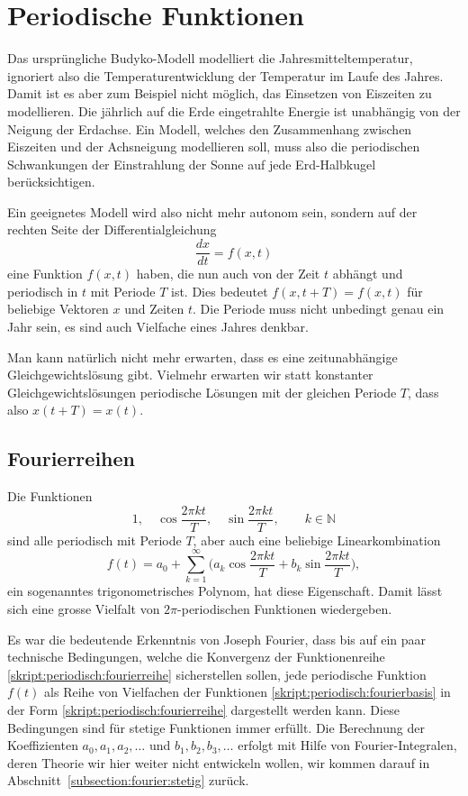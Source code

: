 %
%
%
\section{Periodische Funktionen}
Das ursprüngliche Budyko-Modell modelliert die Jahresmitteltemperatur,
ignoriert also die Temperaturentwicklung der Temperatur im Laufe des
Jahres.
Damit ist es aber zum Beispiel nicht möglich, das Einsetzen von
Eiszeiten zu modellieren.
Die jährlich
auf die Erde eingetrahlte Energie ist unabhängig von der Neigung der
Erdachse.
Ein Modell, welches den Zusammenhang zwischen Eiszeiten und der
Achsneigung modellieren soll, muss also die periodischen Schwankungen
der Einstrahlung der Sonne auf jede Erd-Halbkugel berücksichtigen.

Ein geeignetes Modell wird also nicht mehr autonom sein, sondern auf der
rechten Seite der Differentialgleichung
\[
\frac{dx}{dt} = f(x,t)
\]
eine Funktion $f(x,t)$ haben, die nun auch von der Zeit $t$ abhängt
und periodisch in $t$ mit Periode $T$ ist.
Dies bedeutet $f(x,t+T)=f(x,t)$ für beliebige Vektoren $x$ und 
Zeiten $t$.
Die Periode muss nicht unbedingt genau ein Jahr sein, es sind auch
Vielfache eines Jahres denkbar.

Man kann natürlich nicht mehr erwarten, dass es eine zeitunabhängige
Gleichgewichtslösung gibt.
Vielmehr erwarten wir statt konstanter Gleichgewichtslösungen 
periodische Lösungen mit der gleichen Periode $T$, dass also
$x(t+T)=x(t)$.

\subsection{Fourierreihen}
Die Funktionen
\begin{equation}
1,\quad
\cos \frac{2\pi kt}{T},\quad
\sin \frac{2\pi kt}{T},\qquad k\in \mathbb N
\label{skript:periodisch:fourierbasis}
\end{equation}
sind alle periodisch mit Periode $T$, aber auch eine beliebige
Linearkombination
\begin{equation}
f(t)
=
a_0  +\sum_{k=1}^\infty\biggl(
a_k \cos \frac{2\pi kt}{T} + b_k\sin\frac{2\pi kt}{T}
\biggr),
\label{skript:periodisch:fourierreihe}
\end{equation}
ein sogenanntes trigonometrisches Polynom, hat diese Eigenschaft.
Damit lässt sich eine grosse Vielfalt von $2\pi$-periodischen
Funktionen wiedergeben.

Es war die bedeutende Erkenntnis von Joseph Fourier, dass bis auf ein
%
paar technische Bedingungen, welche die Konvergenz der Funktionenreihe
\eqref{skript:periodisch:fourierreihe}
sicherstellen sollen, jede periodische Funktion $f(t)$ 
als Reihe von Vielfachen der Funktionen
\eqref{skript:periodisch:fourierbasis}
in der Form
\eqref{skript:periodisch:fourierreihe}
dargestellt werden kann.
Diese Bedingungen sind für stetige Funktionen immer erfüllt.
Die Berechnung der Koeffizienten $a_0,a_1,a_2,\dots$ und $b_1,b_2,b_3,\dots$
erfolgt mit Hilfe von Fourier-Integralen, deren Theorie wir hier weiter
nicht entwickeln wollen, wir kommen darauf in
Abschnitt~\ref{subsection:fourier:stetig} zurück.

